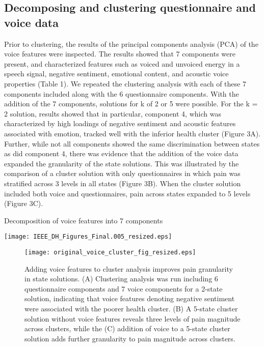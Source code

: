 \documentclass[conference]{IEEEtran}
\begin{document}
\subsection{Decomposing and clustering questionnaire and voice data} 

Prior to clustering, the results of the principal components analysis (PCA) of the voice features were inspected. The results showed that 7 components were present, and characterized features such as voiced and unvoiced energy in a speech signal, negative sentiment, emotional content, and acoustic voice properties (Table 1). We repeated the clustering analysis with each of these 7 components included along with the 6 questionnaire components. With the addition of the 7 components, solutions for k of 2 or 5 were possible. For the k = 2 solution, results showed that in particular, component 4, which was characterized by high loadings of negative sentiment and acoustic features associated with emotion, tracked well with the inferior health cluster (Figure 3A). Further, while not all components showed the same discrimination between states as did component 4, there was evidence that the addition of the voice data expanded the granularity of the state solutions. This was illustrated by the comparison of a cluster solution with only questionnaires in which pain was stratified across 3 levels in all states (Figure 3B). When the cluster solution included both voice and questionnaires, pain across states expanded to 5 levels (Figure 3C). 

\begin{table}[htbp]
\caption{Decomposition of voice features into 7 components}
\centerline{\texttt{[image: IEEE\_DH\_Figures\_Final.005\_resized.eps]}}
\label{fig}
\end{table}


\begin{figure}[htbp]
\centerline{\texttt{[image: original\_voice\_cluster\_fig\_resized.eps]}}
\caption{Adding voice features to cluster analysis improves pain granularity in state solutions. (A) Clustering analysis was run including 6 questionnaire components and 7 voice components for a 2-state solution, indicating that voice features denoting negative sentiment were associated with the poorer health cluster. (B) A 5-state cluster solution without voice features reveals three levels of pain magnitude across clusters, while the (C) addition of voice to a 5-state cluster solution adds further granularity to pain magnitude across clusters.}
\label{fig}
\end{figure}
\end{document}
